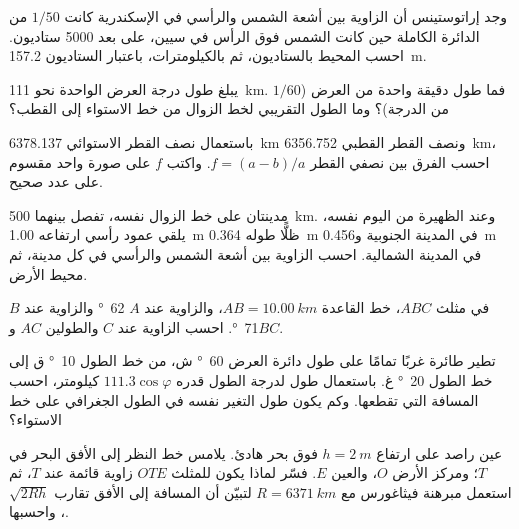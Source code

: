 \begin{exercise}[$\star$]\label{exo:g10:measuring-the-earth:3}
وجد إراتوستينس أن الزاوية بين أشعة الشمس والرأسي في الإسكندرية كانت $1/50$ من
الدائرة الكاملة حين كانت الشمس فوق الرأس في سيين، على بعد 5000 ستاديون. احسب
المحيط بالستاديون، ثم بالكيلومترات، باعتبار الستاديون
\qty{157.2}{m}.
\end{exercise}

\begin{exercise}[$\star$]\label{exo:g10:measuring-the-earth:4}
يبلغ طول درجة العرض الواحدة نحو \qty{111}{km}. فما طول دقيقة واحدة من العرض
($1/60$ من الدرجة)؟ وما الطول التقريبي لخط الزوال من خط الاستواء إلى
القطب؟
\end{exercise}

\begin{exercise}[$\star$]\label{exo:g10:measuring-the-earth:5}
باستعمال نصف القطر الاستوائي \qty{6378.137}{km} ونصف القطر القطبي
\qty{6356.752}{km}، احسب الفرق بين نصفي القطر 
$f = (a-b)/a$. واكتب $f$ على صورة واحد مقسوم على عدد صحيح.
\end{exercise}

\begin{exercise}[$\star\star$]\label{exo:g10:measuring-the-earth:6}
مدينتان على خط الزوال نفسه، تفصل بينهما \qty{500}{km}. وعند الظهيرة من اليوم
نفسه، يلقي عمود رأسي ارتفاعه \qty{1.00}{m} ظلًّا طوله \qty{0.364}{m} في
المدينة الجنوبية و\qty{0.456}{m} في المدينة الشمالية. احسب الزاوية بين أشعة
الشمس والرأسي في كل مدينة، ثم محيط
الأرض.
\end{exercise}

\begin{exercise}[$\star\star$]\label{exo:g10:measuring-the-earth:7}
في مثلث $ABC$، خط القاعدة $AB = \qty{10.00}{km}$، والزاوية عند $A$
\qty{62}{\degree} والزاوية عند $B$ \qty{71}{\degree}. احسب الزاوية عند $C$
والطولين $AC$ و$BC$.
\end{exercise}

\begin{exercise}[$\star\star$]\label{exo:g10:measuring-the-earth:8}
تطير طائرة غربًا تمامًا على طول دائرة العرض \qty{60}{\degree} ش، من خط الطول
\qty{10}{\degree} ق إلى خط الطول \qty{20}{\degree} غ. باستعمال طول لدرجة الطول
قدره $111.3 \cos \varphi$ كيلومتر، احسب المسافة التي تقطعها. وكم يكون طول
التغير نفسه في الطول الجغرافي على خط الاستواء؟
\end{exercise}

\begin{exercise}[$\star\star$]\label{exo:g10:measuring-the-earth:9}
عين راصد على ارتفاع $h = \qty{2}{m}$ فوق بحر هادئ. يلامس خط النظر إلى الأفق
البحر في $T$؛ ومركز الأرض $O$، والعين $E$. فسّر لماذا يكون للمثلث $OTE$
زاوية قائمة عند $T$، ثم استعمل مبرهنة فيثاغورس مع $R = \qty{6371}{km}$
لتبيّن أن المسافة إلى الأفق تقارب $\sqrt{2Rh}$، واحسبها.
\end{exercise}

